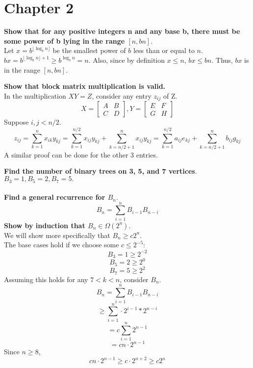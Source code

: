 \section{Chapter 2}

\begin{problem}{2.2}
\textbf{Show that for any positive integers n and any base b, there must be some power of b lying in the range $[n, bn]$}.
\\
Let $x = b^{\lfloor \log_b n \rfloor}$ be the smallest power of $b$ less than or equal to $n$. $bx = b^{\lfloor \log_b n \rfloor + 1} \geq b^{\log_b n} = n$. Also, since by definition $x \leq n$, $bx \leq bn$. Thus, $bx$ is in the range $[n, bn]$.
\end{problem}

\begin{problem}{2.11}
    \textbf{Show that block matrix multiplication is valid.}
    \\
    In the multiplication $XY = Z$, consider any entry $z_{ij}$ of Z.
    \[
        X = 
        \begin{bmatrix}
        A & B \\ C & D
        \end{bmatrix}, 
        Y = 
        \begin{bmatrix}
        E & F \\ G & H
        \end{bmatrix}
    \]
    Suppose $i, j < n / 2$.
    \[
        z_{ij} = \sum_{k = 1}^{n} x_{ik}y_{kj} = \sum_{k = 1}^{n / 2} x_{ij}y_{kj} + \sum_{k = n / 2 + 1}^{n} x_{ij}y_{kj} = \sum_{k = 1}^{n / 2} a_{ij}e_{kj} + \sum_{k = n / 2 + 1}^{n} b_{ij}g_{kj}
    \]
    A similar proof can be done for the other 3 entries.
\end{problem}

\begin{problem}{2.13}
    \textbf{Find the number of binary trees on 3, 5, and 7 vertices}. \\
    $B_3 = 1, B_5 = 2, B_7 = 5.$ \\ \\
    \textbf{Find a general recurrence for $B_n$}.
    \[
        B_n = \sum_{i = 1}^{n} B_{i - 1}B_{n - i}
    \]
    \textbf{Show by induction that $B_n \in \Omega(2^n).$} \\
    We will show more specifically that $B_n \geq c 2^{n}$. \\
    The base cases hold if we choose some $c \leq 2^{-5}$:
    \[
        B_3 = 1 \geq 2^{-2}
    \]
    \[
        B_5 = 2 \geq 2^0
    \]
    \[
        B_7 = 5 \geq 2^2
    \]
    Assuming this holds for any $7 < k < n$, consider $B_n.$
    \[
        B_n = \sum_{i = 1}^{n} B_{i - 1}B_{n - i}
    \]
    \[
        \geq \sum_{i = 1}^{n} \cdot 2^{i - 1} * 2^{n - i}
    \]
    \[
        = c \sum_{i = 1}^{n} 2^{n - 1}
    \]
    \[
        = cn \cdot 2^{n - 1}
    \]
    Since $n \geq 8$,
    \[
        cn \cdot 2^{n - 1} \geq c \cdot 2^{n + 2} \geq c2^n
    \]
\end{problem}

